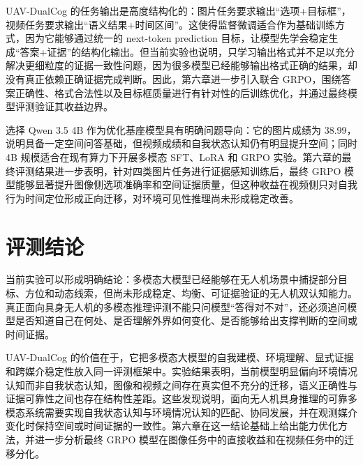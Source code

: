 UAV-DualCog 的任务输出是高度结构化的：图片任务要求输出“选项+目标框”，视频任务要求输出“语义结果+时间区间”。这使得监督微调适合作为基础训练方式，因为它能够通过统一的 next-token prediction 目标，让模型先学会稳定生成“答案+证据”的结构化输出。但当前实验也说明，只学习输出格式并不足以充分解决更细粒度的证据一致性问题，因为很多模型已经能够输出格式正确的结果，却没有真正依赖正确证据完成判断。因此，第六章进一步引入联合 GRPO，围绕答案正确性、格式合法性以及目标框质量进行有针对性的后训练优化，并通过最终模型评测验证其收益边界。

选择 Qwen 3.5 4B 作为优化基座模型具有明确问题导向：它的图片成绩为 38.99，说明具备一定空间问答基础，但视频成绩和自我状态认知仍有明显提升空间；同时 4B 规模适合在现有算力下开展多模态 SFT、LoRA 和 GRPO 实验。第六章的最终评测结果进一步表明，针对四类图片任务进行证据感知训练后，最终 GRPO 模型能够显著提升图像侧选项准确率和空间证据质量，但这种收益在视频侧只对自我行为时间定位形成正向迁移，对环境可见性推理尚未形成稳定改善。

\section{评测结论}

当前实验可以形成明确结论：多模态大模型已经能够在无人机场景中捕捉部分目标、方位和动态线索，但尚未形成稳定、均衡、可证据验证的无人机双认知能力。真正面向具身无人机的多模态推理评测不能只问模型“答得对不对”，还必须追问模型是否知道自己在何处、是否理解外界如何变化、是否能够给出支撑判断的空间或时间证据。

UAV-DualCog 的价值在于，它把多模态大模型的自我建模、环境理解、显式证据和跨媒介稳定性放入同一评测框架中。实验结果表明，当前模型明显偏向环境情况认知而非自我状态认知，图像和视频之间存在真实但不充分的迁移，语义正确性与证据可靠性之间也存在结构性差距。这些发现说明，面向无人机具身推理的可靠多模态系统需要实现自我状态认知与环境情况认知的匹配、协同发展，并在观测媒介变化时保持空间或时间证据的一致性。第六章在这一结论基础上给出能力优化方法，并进一步分析最终 GRPO 模型在图像任务中的直接收益和在视频任务中的迁移分化。
